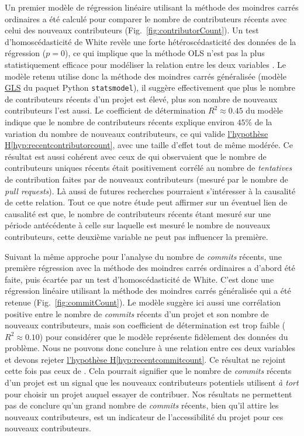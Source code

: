 \documentclass[dvipsnames,runningheads]{llncs}
\newcommand{\en}[1]{\foreignlanguage{english}{\emph{#1}}}
\begin{document}
    Un premier modèle de régression linéaire utilisant la méthode des moindres carrés ordinaires a été calculé
    pour comparer le nombre de contributeurs récents avec celui des nouveaux contributeurs
    (Fig.~\ref{fig:contributorCount}). Un test d'homoscédasticité de White revèle une forte hétéroscédasticité
    des données de la régression ($p = 0$), ce qui implique que la méthode OLS n'est pas la plus
    statistiquement efficace pour modéliser la relation entre les deux variables \parencite{GLS-2021}. Le
    modèle retenu utilise donc la méthode des moindres carrés généralisée (modèle
    \href{https://www.statsmodels.org/dev/generated/statsmodels.regression.linear_model.GLS.html}{GLS} du
    paquet Python \texttt{statsmodel}), il suggère effectivement que plus le nombre de contributeurs récents
    d'un projet est élevé, plus son nombre de nouveaux contributeurs l'est aussi. Le coefficient de
    détermination $R^2 \approx 0.45$ du modèle indique que le nombre de contributeurs récents explique environ
    $45\%$ de la variation du nombre de nouveaux contributeurs, ce qui valide
    \hyperref[hyp:recentcontributorcount]{l'hypothèse H\ref*{hyp:recentcontributorcount}}, avec une taille
    d'effet tout de même modérée. Ce résultat est aussi cohérent avec ceux de
    \textcite[p.~12-13,16]{signals-2019} qui observaient que le nombre de contributeurs uniques récents était
    positivement corrélé au nombre de \emph{tentatives} de contribution faites par de nouveaux contributeurs
    (mesuré par le nombre de \en{pull requests}). Là aussi de futures recherches pourraient s'intéresser à la
    causalité de cette relation. Tout ce que notre étude peut affirmer sur un éventuel lien de causalité est
    que, le nombre de contributeurs récents étant mesuré sur une période antécédente à celle sur laquelle est
    mesuré le nombre de nouveaux contributeurs, cette deuxième variable ne peut pas influencer la première.

    Suivant la même approche pour l'analyse du nombre de \en{commits} récents, une première régression avec la
    méthode des moindres carrés ordinaires a d'abord été faite, puis écartée par un test d'homoscédasticité de
    White. C'est donc une régression linéaire utilisant la méthode des moindres carrés généralisée qui a été
    retenue (Fig.~\ref{fig:commitCount}). Le modèle suggère ici aussi une corrélation positive entre le nombre
    de \en{commits} récents d'un projet et son nombre de nouveaux contributeurs, mais son coefficient de
    détermination est trop faible ($R^2 \approx 0.10$) pour considérer que le modèle représente fidèlement des
    données du problème. Nous ne pouvons donc conclure à une relation entre ces deux variables et devons
    rejeter \hyperref[hyp:recentcommitcount]{l'hypothèse H\ref*{hyp:recentcommitcount}}. Ce résultat ne
    rejoint cette fois pas ceux de \textcite[p.~13,16]{signals-2019}. Cela pourrait signifier que le nombre de
    \en{commits} récents d'un projet est un signal que les nouveaux contributeurs potentiels utilisent \emph{à
    tort} pour choisir un projet auquel essayer de contribuer. Nos résultats ne permettent pas de conclure
    qu'un grand nombre de \en{commits} récents, bien qu'il attire les nouveaux contributeurs, est un
    indicateur de l'accessibilité du projet pour ces nouveaux contributeurs.
\end{document}
